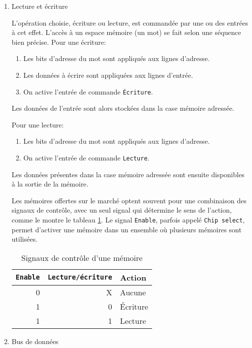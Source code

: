 \documentclass[letter, oneside]{book}
\begin{document}
\begin{enumerate}
\item Lecture et écriture
\label{sec:org5f9123c}

L'opération choisie, écriture ou lecture, est commandée par une ou des
entrées à cet effet. L'accès à un espace mémoire (un mot) se fait
selon une séquence bien précise. Pour une écriture:

\begin{enumerate}
\item Les bits d'adresse du mot sont appliqués aux lignes d'adresse.
\item Les données à écrire sont appliquées aux lignes d'entrée.
\item On active l'entrée de commande \texttt{Écriture}.
\end{enumerate}

Les données de l'entrée sont alors stockées dans la case mémoire adressée.

Pour une lecture:

\begin{enumerate}
\item Les bits d'adresse du mot sont appliqués aux lignes d'adresse.
\item On active l'entrée de commande \texttt{Lecture}.
\end{enumerate}

Les données présentes dans la case mémoire adressée sont ensuite
disponibles à la sortie de la mémoire.

Les mémoires offertes sur le marché optent souvent pour une
combinaison des signaux de contrôle, avec un seul signal qui détermine
le sens de l'action, comme le montre le tableau
\ref{tab:org630f466}. Le signal \texttt{Enable}, parfois appelé \texttt{Chip
select}, permet d'activer une mémoire dans un ensemble où plusieurs
mémoires sont utilisées.

\begin{table}[htbp]
\caption{\label{tab:org630f466}Signaux de contrôle d'une mémoire}
\centering
\begin{tabular}{rrl}
\texttt{Enable} & \texttt{Lecture/écriture} & Action\\[0pt]
\hline
0 & X & Aucune\\[0pt]
1 & 0 & Écriture\\[0pt]
1 & 1 & Lecture\\[0pt]
\end{tabular}
\end{table}

\item Bus de données
\label{sec:org4e8b27b}


\end{enumerate}
\end{document}
